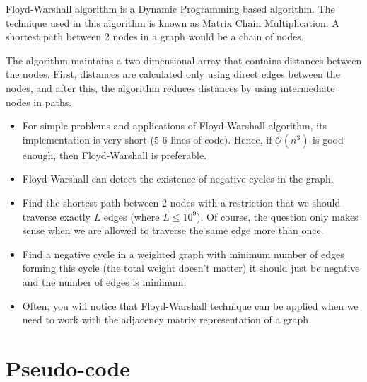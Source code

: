 \documentclass[twoside,12pt,a4paper,english]{book}
\theoremstyle{definition}
\theoremstyle{problemstyle}
\theoremstyle{problemstyle}
\theoremstyle{problemstyle}
\begin{document}
\vspace{10mm}

Floyd-Warshall algorithm is a Dynamic Programming based algorithm. The technique used in this algorithm is known as Matrix Chain Multiplication. A shortest path between $2$ nodes in a graph would be a chain of nodes.

\vspace{10mm}

The algorithm maintains a two-dimensional array that contains distances
between the nodes. First, distances are calculated only using direct edges between
the nodes, and after this, the algorithm reduces distances by using intermediate
nodes in paths.

\vspace{10mm}


\begin{tcolorbox}[title=Why don't we apply Djikstra from each node?]
\begin{itemize}
    \setlength\itemsep{1em}
    \item For simple problems and applications of Floyd-Warshall algorithm, its implementation is very short (5-6 lines of code). Hence, if $\mathcal{O}(n^3)$ is good enough, then Floyd-Warshall is preferable.
    \item Floyd-Warshall can detect the existence of negative cycles in the graph.
\end{itemize}
\end{tcolorbox}

\begin{tcolorbox}[title=Advantages of Floyd-Warshall over Djikstra, breakable]
\begin{itemize}
    \setlength\itemsep{1em}
    \item Find the shortest path between $2$ nodes with a restriction that we should traverse exactly $L$ edges (where $L \leq 10^9$). Of course, the question only makes sense when we are allowed to traverse the same edge more than once.
    \item Find a negative cycle in a weighted graph with minimum number of edges forming this cycle (the total weight doesn't matter) it should just be negative and the number of edges is minimum.
    \item Often, you will notice that Floyd-Warshall technique can be applied when we need to work with the adjacency matrix representation of a graph.
\end{itemize}
\end{tcolorbox}
\section{Pseudo-code}
\end{document}
